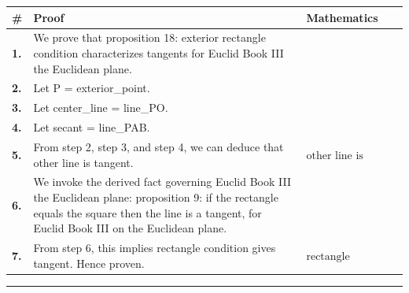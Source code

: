 \documentclass[11pt]{article}
\theoremstyle{definition}
\begin{document}
\begin{tabular}{@{} >{\raggedright\arraybackslash}p{} >{\raggedright\arraybackslash}p{} >{\raggedleft\arraybackslash}p{} @{}}
\textbf{\#} & \textbf{Proof} & \textbf{Mathematics} \\
\midrule
\textbf{1.} & We prove that proposition 18: exterior rectangle condition characterizes tangents for Euclid Book III the Euclidean plane. & \\[0.45em]
\textbf{2.} & Let P = exterior\_point. & \\[0.45em]
\textbf{3.} & Let center\_line = line\_PO. & \\[0.45em]
\textbf{4.} & Let secant = line\_PAB. & \\[0.45em]
\textbf{5.} & From step 2, step 3, and step 4, we can deduce that other line is tangent. & $\displaystyle \text{other line is tangent}$ \\[0.45em]
\textbf{6.} & We invoke the derived fact governing Euclid Book III the Euclidean plane: proposition 9: if the rectangle equals the square then the line is a tangent, for Euclid Book III on the Euclidean plane. & \\[0.45em]
\textbf{7.} & From step 6, this implies rectangle condition gives tangent. Hence proven. & $\displaystyle \text{rectangle condition gives tangent}$ \\[0.45em]
\bottomrule
\end{tabular}
\label{thm:Geometry-Euclid Book III-proposition_18_exterior_rectangle_condition_characterizes_tangents}
\par\medskip\hrule
\end{document}
